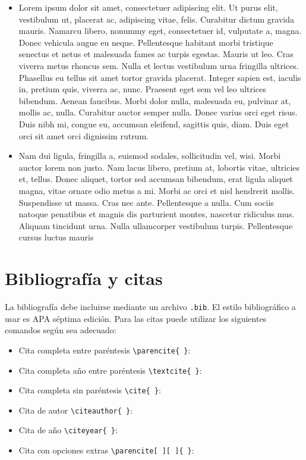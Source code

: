 \documentclass[11pt]{article}
\begin{document}
\begin{itemize}[leftmargin=*]
\item 
    Lorem ipsum dolor sit amet, consectetuer adipiscing elit. Ut purus elit, vestibulum ut, placerat ac, adipiscing vitae, felis. Curabitur dictum gravida mauris. Namarcu libero, nonummy eget, consectetuer id, vulputate a, magna. Donec vehicula augue eu neque. Pellentesque habitant morbi tristique senectus et netus et malesuada fames ac turpis egestas. Mauris ut leo. Cras viverra metus rhoncus sem. Nulla et lectus vestibulum urna fringilla ultrices. Phasellus eu tellus sit amet tortor gravida placerat. Integer sapien est, iaculis in, pretium quis, viverra ac, nunc. Praesent eget sem vel leo ultrices bibendum. Aenean faucibus. Morbi dolor nulla, malesuada eu, pulvinar at, mollis ac, nulla. Curabitur auctor semper nulla. Donec varius orci eget risus. Duis nibh mi, congue eu, accumsan eleifend, sagittis quis, diam. Duis eget orci sit amet orci dignissim rutrum.

\item
    Nam dui ligula, fringilla a, euismod sodales, sollicitudin vel, wisi. Morbi auctor lorem non justo. Nam lacus libero, pretium at, lobortis vitae, ultricies et, tellus. Donec aliquet, tortor sed accumsan bibendum, erat ligula aliquet magna, vitae ornare odio metus a mi. Morbi ac orci et nisl hendrerit mollis. Suspendisse ut massa. Cras nec ante. Pellentesque a nulla. Cum sociis natoque penatibus et magnis dis parturient montes, nascetur ridiculus mus. Aliquam tincidunt urna. Nulla ullamcorper vestibulum turpis. Pellentesque cursus luctus mauris
\end{itemize}

\section{Bibliografía y citas}

La bibliografía debe incluirse mediante un archivo \texttt{.bib}. El estilo bibliográfico a usar es APA séptima edición. Para las citas puede utilizar los siguientes comandos según sea adecuado:
\begin{itemize}
\item 
    Cita completa entre paréntesis \verb"\parencite{ }": \parencite{stewartpre}
\item
    Cita completa año entre paréntesis \verb"\textcite{ }": \textcite{stewartpre}
\item 
    Cita completa sin paréntesis \verb"\cite{ }": \cite{stewartpre}
\item
    Cita de autor \verb"\citeauthor{ }": \citeauthor{stewartpre}
\item
    Cita de año \verb"\citeyear{ }": \citeyear{stewartpre}
\item 
    Cita con opciones extras \verb"\parencite[ ][ ]{ }": \parencite[ver][p. 66]{stewartpre}
\end{itemize}
\end{document}
